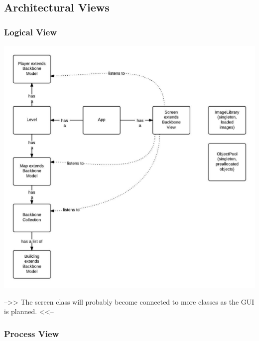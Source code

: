 \subsection{Architectural Views}

\subsubsection{Logical View} %
\includegraphics{pictures/class_diagram}

-->> The screen class will probably become connected to more classes as the GUI is planned. <<--

\subsubsection{Process View} %

